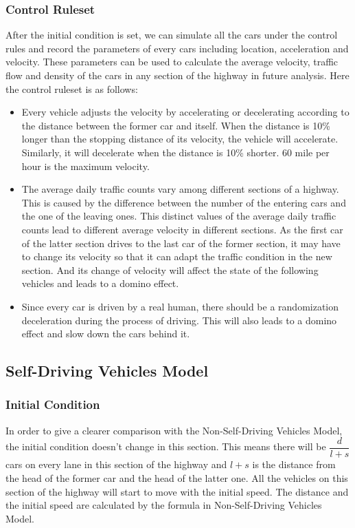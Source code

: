 \documentclass[a4paper]{article}
\begin{document}
	\subsubsection{Control Ruleset}
	After the initial condition is set, we can simulate all the cars under the control rules and record the parameters of every cars including location, acceleration and velocity. These parameters can be used to calculate the average velocity, traffic flow and density of the cars in any section of the highway in future analysis. Here the control ruleset is as follows:
	\begin{itemize}
		\item Every vehicle adjusts the velocity by accelerating or decelerating according to the distance between the former car and itself. When the distance is 10\% longer than the stopping distance of its velocity, the vehicle will accelerate. Similarly, it will decelerate when the distance is 10\% shorter. 60 mile per hour is the maximum velocity.
		\item The average daily traffic counts vary among different sections of a highway. This is caused by the difference between the number of the entering cars and the one of the leaving ones. This distinct values of the average daily traffic counts lead to different average velocity in different sections. As the first car of the latter section drives to the last car of the former section, it may have to change its velocity so that it can adapt the traffic condition in the new section. And its change of velocity will affect the state of the following vehicles and leads to a domino effect.
		\item  Since every car is driven by a real human, there should be a randomization deceleration during the process of driving. This will also leads to a domino effect and slow down the cars behind it.
	\end{itemize}	
	
	\subsection{Self-Driving Vehicles Model}
	\subsubsection{Initial Condition}
	In order to give a clearer comparison with the Non-Self-Driving Vehicles Model, the initial condition doesn't change in this section. This means there will be $ \dfrac{d}{l+s} $ cars on every lane in this section of the highway and $ l+s $ is the distance from the head of the former car and the head of the latter one. All the vehicles on this section of the highway will start to move with the initial speed. The distance and the initial speed are calculated by the formula in Non-Self-Driving Vehicles Model.
	
\end{document}
